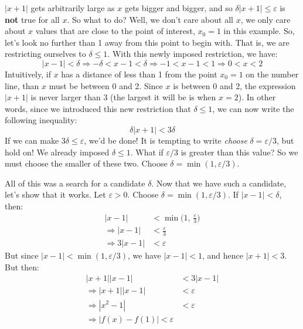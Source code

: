 \documentclass{article}
\theoremstyle{normal}
\begin{document}
    $|x+1|$ gets arbitrarily large as $x$ gets bigger and bigger, and so
    $\delta|x+1|\leq\varepsilon$ is \textbf{not} true for all $x$. So what to
    do? Well, we don't care about all $x$, we only care about $x$ values that
    are close to the point of interest, $x_{0}=1$ in this example. So, let's
    look no further than 1 away from this point to begin with. That is, we are
    restricting ourselves to $\delta\leq{1}$. With this newly imposed
    restriction, we have:
    \begin{equation}
        |x-1|<\delta\Rightarrow-\delta<x-1<\delta
        \Rightarrow-1<x-1<1\Rightarrow0<x<2
    \end{equation}
    Intuitively, if $x$ has a distance of less than 1 from the point
    $x_{0}=1$ on the number line, than $x$ must be between 0 and 2. Since
    $x$ is between 0 and 2, the expression $|x+1|$ is never larger than 3
    (the largest it will be is when $x=2$). In other words, since we
    introduced this new restriction that $\delta\leq{1}$, we can now write the
    following inequality:
    \begin{equation}
        \delta|x+1|<3\delta
    \end{equation}
    If we can make $3\delta\leq{\varepsilon}$, we'd be done! It is tempting to
    write \textit{choose} $\delta=\varepsilon/3$, but hold on! We already
    imposed $\delta\leq{1}$. What if $\varepsilon/3$ is greater than this
    value? So we must choose the smaller of these two.
    Choose $\delta=\min(1,\varepsilon/3)$.
    \par\hfill\par
    All of this was a search for a candidate $\delta$. Now that we have such
    a candidate, let's show that it works. Let $\varepsilon>0$. Choose
    $\delta=\min(1,\varepsilon/3)$. If $|x-1|<\delta$, then:
    \begin{align}
        |x-1|&<\min\Big(1,\,\frac{\varepsilon}{3}\Big)
            \tag{Definition of $\delta$}\\
        \Rightarrow
            |x-1|&<\frac{\varepsilon}{3}
                \tag{Definition of $\min$}\\
        \Rightarrow
            3|x-1|&<\varepsilon
                \tag{Multiplication by a Positive Number}
    \end{align}
    But since $|x-1|<\min(1,\varepsilon/3)$, we have $|x-1|<1$, and hence
    $|x+1|<3$. But then:
    \begin{align}
        |x+1||x-1|&<3|x-1|
            \tag{Since $|x+1|<3$}\\
        \Rightarrow
            |x+1||x-1|&<\varepsilon
                \tag{Since $3|x-1|<\varepsilon$}\\
        \Rightarrow
            |x^{2}-1|&<\varepsilon
                \tag{Simplify the Expression}\\
        \Rightarrow
            |f(x)-f(1)|<\varepsilon
                \tag{Definition of $f$}
    \end{align}
\end{document}
